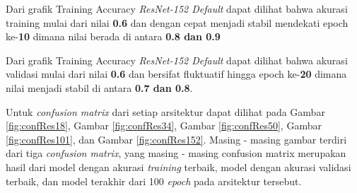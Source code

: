 Dari grafik Training Accuracy \emph{ResNet-152 Default} dapat dilihat bahwa akurasi training mulai dari nilai \textbf{0.6} dan dengan cepat menjadi stabil mendekati epoch ke-\textbf{10} dimana nilai berada di antara \textbf{0.8 dan 0.9} 

Dari grafik Training Accuracy \emph{ResNet-152 Default} dapat dilihat bahwa akurasi validasi mulai dari nilai \textbf{0.6} dan bersifat fluktuatif hingga epoch ke-\textbf{20} dimana nilai menjadi stabil di antara \textbf{0.7 dan 0.8}.

Untuk \emph{confusion matrix} dari setiap arsitektur dapat dilihat pada Gambar \ref{fig:confRes18}, Gambar \ref{fig:confRes34}, Gambar \ref{fig:confRes50}, Gambar \ref{fig:confRes101}, dan Gambar \ref{fig:confRes152}. Masing - masing gambar terdiri dari tiga \emph{confusion matrix}, yang masing - masing confusion matrix merupakan hasil dari model dengan akurasi \emph{training} terbaik, model dengan akurasi validasi terbaik, dan model terakhir dari 100 \emph{epoch} pada arsitektur tersebut.
\pagebreak
